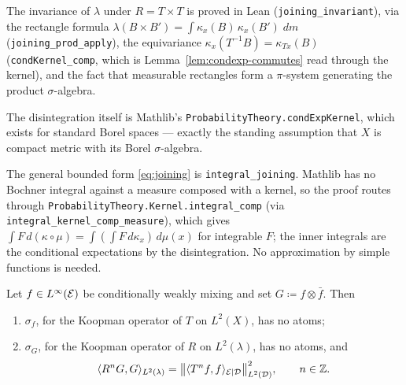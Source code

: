 \begin{remark}
  \leanok
  The invariance of $\lambda$ under $R = T\times T$ is proved in Lean
  (\texttt{joining\_invariant}), via the rectangle formula
  $\lambda(B\times B') = \int \kappa_x(B)\,\kappa_x(B')\;dm$
  (\texttt{joining\_prod\_apply}), the equivariance $\kappa_x(T^{-1}B) = \kappa_{Tx}(B)$
  (\texttt{condKernel\_comp}, which is Lemma~\ref{lem:condexp-commutes} read through the
  kernel), and the fact that measurable rectangles form a $\pi$-system generating the product
  $\sigma$-algebra.

  The disintegration itself is Mathlib's \texttt{ProbabilityTheory.condExpKernel}, which exists
  for standard Borel spaces --- exactly the standing assumption that $X$ is compact metric with
  its Borel $\sigma$-algebra.

  The general bounded form \eqref{eq:joining} is \texttt{integral\_joining}.  Mathlib has no
  Bochner integral against a measure composed with a kernel, so the proof routes through
  \texttt{ProbabilityTheory.Kernel.integral\_comp} (via \texttt{integral\_kernel\_comp\_measure}),
  which gives $\int F\,d(\kappa\circ\mu) = \int(\int F\,d\kappa_x)\,d\mu(x)$ for integrable $F$;
  the inner integrals are the conditional expectations by the disintegration.  No approximation by
  simple functions is needed.
\end{remark}

\begin{lemma}
  \label{lem:atomless}
  \leanok
  Let $f \in L^\infty(\mathcal{E})$ be conditionally weakly mixing and set $G \coloneqq f \otimes \bar f$.
  Then
  \begin{enumerate}
    \item[(i)] $\sigma_f$, for the Koopman operator of $T$ on $L^2(X)$, has no atoms;
    \item[(ii)] $\sigma_G$, for the Koopman operator of $R$ on $L^2(\lambda)$, has no atoms, and
      \begin{equation}
        \label{eq:psi-identity}
        \langle R^n G, G \rangle_{L^2(\lambda)} = \bigl\lVert \langle T^n f, f \rangle_{\mathcal{E} \mid \mathcal{D}} \bigr\rVert_{L^2(\mathcal{D})}^2 ,
        \qquad n \in \mathbb{Z} .
      \end{equation}
  \end{enumerate}
\end{lemma}

